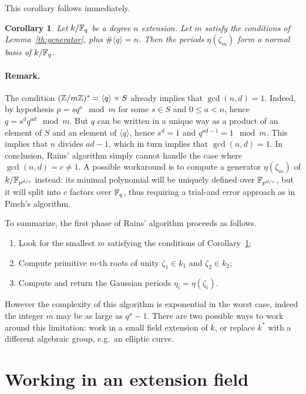 \documentclass{article}
\newtheorem{Coro}{Corollary}
\begin{document}
This corollary follows immediately.

\begin{Coro}
  \label{th:basic-rains}
  Let $k/\mathbb{F}_q$ be a degree $n$ extension. Let $m$ satisfy the
  conditions of Lemma~\ref{th:generator}, plus $\#\langle q\rangle =
  n$.  Then the periods $\eta(\zeta_m)$ form a normal basis of
  $k/\mathbb{F}_q$.
\end{Coro}

\paragraph{Remark.} The condition $(\mathbb{Z}/m\mathbb{Z})^\ast = \langle
q\rangle\times S$ already implies that $\gcd(n,d)=1$. Indeed, by
hypothesis $p=sq^a\mod m$ for some $s\in S$ and $0\le a<n$, hence
$q=s^dq^{ad}\mod m$. But $q$ can be written in a unique way as a
product of an element of $S$ and an element of $\langle q\rangle$,
hence $s^d=1$ and $q^{ad-1}=1\mod m$. This implies that $n$ divides
$ad-1$, which in turn implies that $\gcd(n,d)=1$. In conclusion,
Rains' algorithm simply cannot handle the case where
$\gcd(n,d)=c\ne1$. A possible workaround is to compute a generator
$\eta(\zeta_m)$ of $k/\mathbb{F}_{p^{d/c}}$ instead: its minimal polynomial
will be uniquely defined over $\mathbb{F}_{p^{d/c}}$, but it will split into
$c$ factors over $\mathbb{F}_q$, thus requiring a trial-and error approach as
in Pinch's algorithm.

To summarize, the first phase of Rains' algorithm proceeds as follows.

\begin{enumerate}
\item Look for the smallest $m$ satisfying the conditions of
  Corollary~\ref{th:basic-rains};
\item Compute primitive $m$-th roots of unity $\zeta_1\in k_1$ and
  $\zeta_2\in k_2$;
\item Compute and return the Gaussian periods $\eta_i=\eta(\zeta_i)$.
\end{enumerate}

However the complexity of this algorithm is exponential in the worst
case, indeed the integer $m$ may be as large as $q^n-1$. There are two
possible ways to work around this limitation: work in a small field
extension of $k$, or replace $k^\ast$ with a different algebraic
group, e.g.\ an elliptic curve.

\section{Working in an extension field}
\end{document}
